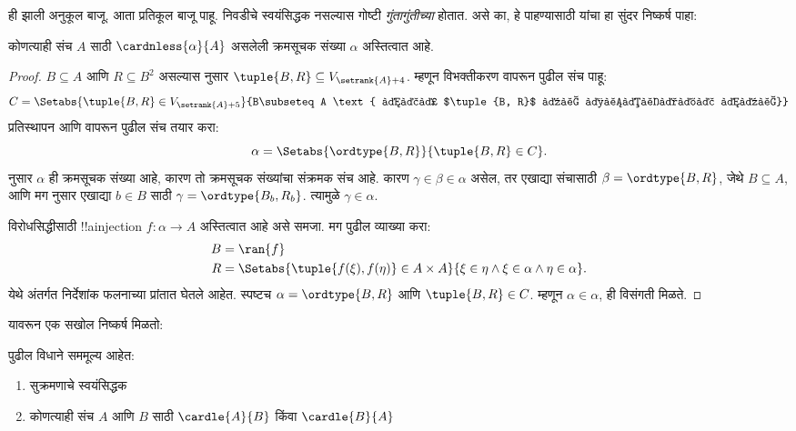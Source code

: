 \documentclass[../../../include/open-logic-section]{subfiles}
\begin{document}

ही झाली अनुकूल बाजू. आता प्रतिकूल बाजू पाहू. निवडीचे स्वयंसिद्धक नसल्यास गोष्टी \emph{गुंतागुंतीच्या} होतात. असे का, हे पाहण्यासाठी \cite{Hartogs1915} यांचा हा सुंदर निष्कर्ष पाहा:

\begin{lem}[\emph{$\ZF$ मध्ये}]
कोणत्याही संच $A$ साठी $\cardnless{\alpha}{A}$ असलेली क्रमसूचक संख्या $\alpha$ अस्तित्वात आहे.
\end{lem}

\begin{proof}
$B \subseteq A$ आणि $R \subseteq B^2$ असल्यास  नुसार $\tuple{B, R} \subseteq
V_{\setrank{A}+4}$. म्हणून विभक्तीकरण वापरून पुढील संच पाहू:
\[
	C = \Setabs{\tuple{B, R} \in V_{\setrank{A}+5}}{B\subseteq A
	\text{ आणि $\tuple{B, R}$ हे सुक्रमण आहे}}
\]
प्रतिस्थापन आणि  वापरून पुढील संच तयार करा:
\[
	\alpha = \Setabs{\ordtype{B, R}}{\tuple{B, R} \in C}.
\]
 नुसार $\alpha$ ही क्रमसूचक संख्या आहे, कारण तो क्रमसूचक संख्यांचा संक्रमक संच आहे. कारण $\gamma \in \beta \in \alpha$ असेल, तर एखाद्या संचासाठी $\beta = \ordtype{B, R}$, जेथे $B \subseteq A$, आणि मग  नुसार एखाद्या $b
\in B$ साठी $\gamma = \ordtype{B_b, R_b}$. त्यामुळे $\gamma \in \alpha$.


विरोधसिद्धीसाठी !!a{injection} $f \colon \alpha \to A$ अस्तित्वात आहे असे समजा. मग पुढील व्याख्या करा:
\begin{align*}
	B &= \ran{f}\\
	R &= \Setabs{\tuple{f(\xi), f(\eta)} \in A \times A}{\xi \in \eta \land \xi \in \alpha \land \eta \in \alpha}.
\end{align*}
येथे अंतर्गत निर्देशांक फलनाच्या प्रांतात घेतले आहेत. स्पष्टच $\alpha = \ordtype{B, R}$ आणि $\tuple{B, R} \in C$. म्हणून $\alpha
\in \alpha$, ही विसंगती मिळते.
\end{proof}

यावरून एक सखोल निष्कर्ष मिळतो:

\begin{thm}[\emph{$\ZF$ मध्ये}]
पुढील विधाने सममूल्य आहेत:
\begin{enumerate}
	\item{} सुक्रमणाचे स्वयंसिद्धक
	\item{} कोणत्याही संच $A$ आणि $B$ साठी $\cardle{A}{B}$ किंवा
	$\cardle{B}{A}$
\end{enumerate}
\end{thm}
\end{document}
